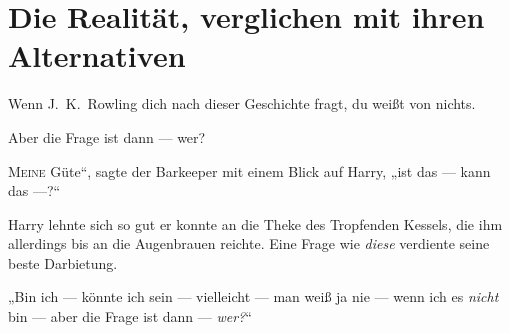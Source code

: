 \chapter{Die Realität, verglichen mit ihren Alternativen}

\begin{chapterOpeningAuthorNote}
Wenn J.~K.~Rowling dich nach dieser Geschichte fragt, du weißt von nichts.
\end{chapterOpeningAuthorNote}
\begin{chapterOpeningQuote}
Aber die Frage ist dann — wer?
\end{chapterOpeningQuote}

\lettrine[ante=„]{M}{eine} Güte“, sagte der Barkeeper mit einem Blick auf Harry, „ist das — kann das —?“

Harry lehnte sich so gut er konnte an die Theke des Tropfenden Kessels, die ihm allerdings bis an die Augenbrauen reichte. Eine Frage wie \emph{diese} verdiente seine beste Darbietung.

„Bin ich — könnte ich sein — vielleicht — man weiß ja nie — wenn ich es \emph{nicht} bin — aber die Frage ist dann — \emph{wer?}“


